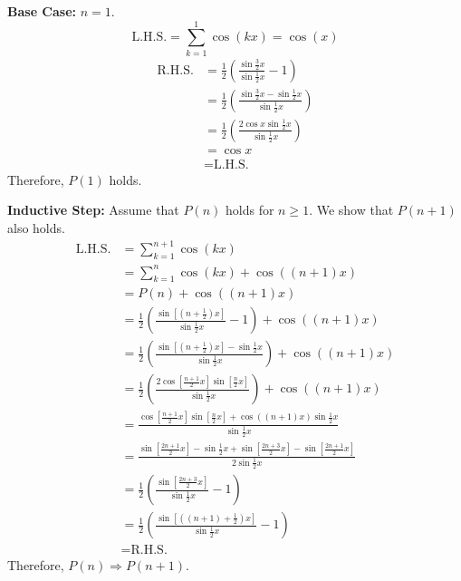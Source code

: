 \documentclass[answers]{exam}
\begin{document}
\begin{questions}
\begin{parts}
\begin{psol}
            \textbf{Base Case:} $n=1$.
            \begin{equation*}
                \text{L.H.S.} = \sum_{k=1}^1 \cos(kx) = \cos(x)
            \end{equation*}
            \begin{align*}
                \text{R.H.S.} &= \frac{1}{2}\left(\frac{\sin\frac{3}{2}x}{\sin\frac{1}{2}x}-1\right)\\
                &= \frac{1}{2} \left(\frac{\sin\frac{3}{2}x-\sin\frac{1}{2}x}{\sin\frac{1}{2}x}\right)\\
                &= \frac{1}{2} \left(\frac{2\cos x\sin\frac{1}{2}x}{\sin\frac{1}{2}x}\right)\\
                &= \cos x \\
                &= \text{L.H.S.}
            \end{align*}
            Therefore, $P(1)$ holds.

            \textbf{Inductive Step:} Assume that $P(n)$ holds for $n\geq 1$. We show that $P(n+1)$ also holds.
            \begin{align*}
                \text{L.H.S.} &= \sum_{k=1}^{n+1} \cos(kx) \\
                &= \sum_{k=1}^n \cos(kx) + \cos\left((n+1)x\right) \\
                &= P(n) + \cos\left((n+1)x\right) \\
                &= \frac{1}{2}\left(\frac{\sin\left[\left(n+\frac{1}{2}\right)x\right]}{\sin\frac{1}{2}x}-1\right) + \cos\left((n+1)x\right) \\
                &= \frac{1}{2}\left(\frac{\sin\left[\left(n+\frac{1}{2}\right)x\right]-\sin\frac{1}{2}x}{\sin\frac{1}{2}x}\right) + \cos\left((n+1)x\right) \\
                &= \frac{1}{2}\left(\frac{2\cos\left[\frac{n+1}{2}x\right]\sin\left[\frac{n}{2}x\right]}{\sin\frac{1}{2}x}\right) + \cos\left((n+1)x\right) \\
                &= \frac{\cos\left[\frac{n+1}{2}x\right]\sin\left[\frac{n}{2}x\right] + \cos\left((n+1)x\right)\sin\frac{1}{2}x}{\sin\frac{1}{2}x} \\
                &= \frac{\sin\left[\frac{2n+1}{2}x\right]-\sin\frac{1}{2}x+\sin\left[\frac{2n+3}{2}x\right]-\sin\left[\frac{2n+1}{2}x\right]}{2\sin\frac{1}{2}x} \\
                &= \frac{1}{2}\left(\frac{\sin\left[\frac{2n+3}{2}x\right]}{\sin\frac{1}{2}x}-1\right) \\
                &= \frac{1}{2}\left(\frac{\sin\left[\left(\left(n+1\right)+\frac{1}{2}\right)x\right]}{\sin\frac{1}{2}x}-1\right) \\
                &= \text{R.H.S.}
            \end{align*}
            Therefore, $P(n) \Rightarrow P(n+1)$.


\end{psol}
\end{parts}
\end{questions}
\end{document}
